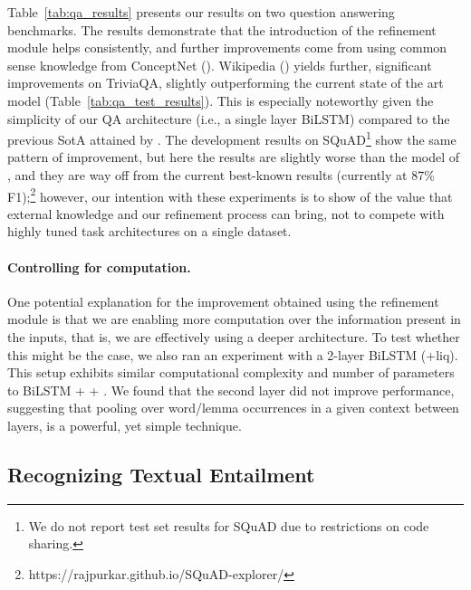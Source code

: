 \documentclass[11pt,a4paper]{article}
\begin{document}
Table~\ref{tab:qa_results} presents our results on two question answering benchmarks. The results demonstrate that the introduction of the refinement module helps consistently, and further improvements come from using common sense knowledge from ConceptNet (). Wikipedia () yields further, significant improvements on TriviaQA, slightly outperforming the current state of the art model (Table~\ref{tab:qa_test_results}). This is especially noteworthy given the simplicity of our QA architecture (i.e., a single layer BiLSTM) compared to the previous SotA attained by . The development results on SQuAD\footnote{We do not report test set results for SQuAD due to restrictions on code sharing.} show the same pattern of improvement, but here the results are slightly worse than the model of , and they are way off from the current best-known results (currently at 87\% F1);\footnote{https://rajpurkar.github.io/SQuAD-explorer/} however, our intention with these experiments is to show of the value that external knowledge and our refinement process can bring, not to compete with highly tuned task architectures on a single dataset.

\paragraph{Controlling for computation.} One potential explanation for the improvement obtained using the refinement module is that we are enabling more computation over the information present in the inputs, that is, we are effectively using a deeper architecture. To test whether this might be the case, we also ran an experiment with a 2-layer BiLSTM (+liq). This setup exhibits similar computational complexity and number of parameters to BiLSTM +  + . We found that the second layer did not improve performance, suggesting that pooling over word/lemma occurrences in a given context between layers, is a powerful, yet simple technique.


\subsection{Recognizing Textual Entailment}
\end{document}
